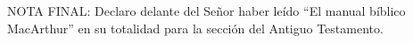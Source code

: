 \documentclass[12pt]{article}
\begin{document}

\tableofcontents
\newpage

\newpage

\newpage

\newpage

\newpage

\newpage

\newpage

\newpage

\newpage

\newpage

\newpage

\newpage

\newpage

\newpage

\newpage

\newpage

\newpage

NOTA FINAL: Declaro delante del Señor haber leído ``El manual bíblico MacArthur'' en su totalidad para la sección del Antiguo Testamento.
\end{document}
